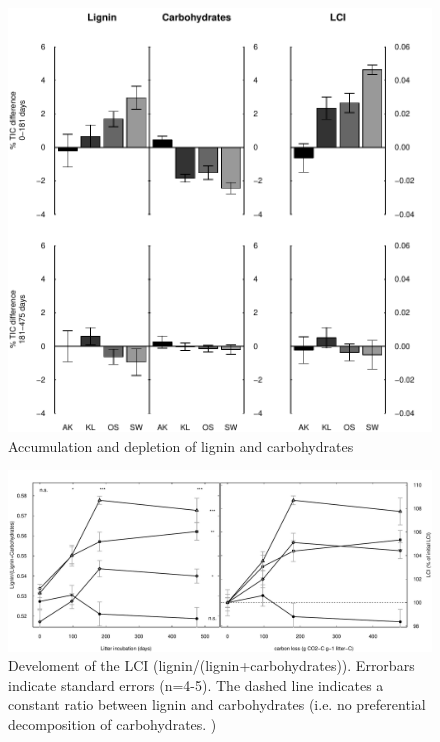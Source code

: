 \documentclass[authoryear,preprint,review,12pt]{elsarticle}
\begin{document}
\newpage
\begin{figure}[h!]
\vspace*{2mm}
\begin{center}
\includegraphics{sbb-chemdif}
\end{center}
\caption{Accumulation and depletion of lignin and carbohydrates}
\label{fig:chemdif}
\end{figure}

\newpage
\begin{figure}[h!]
\vspace*{2mm}
\begin{center}
\includegraphics{sbb-lci}
\end{center}
\caption{Develoment of the LCI (lignin/(lignin+carbohydrates)). Errorbars indicate standard errors (n=4-5). The dashed line indicates a constant ratio between lignin and carbohydrates (i.e. no preferential decomposition of carbohydrates. )}
\label{fig:lci}
\end{figure}
\end{document}
